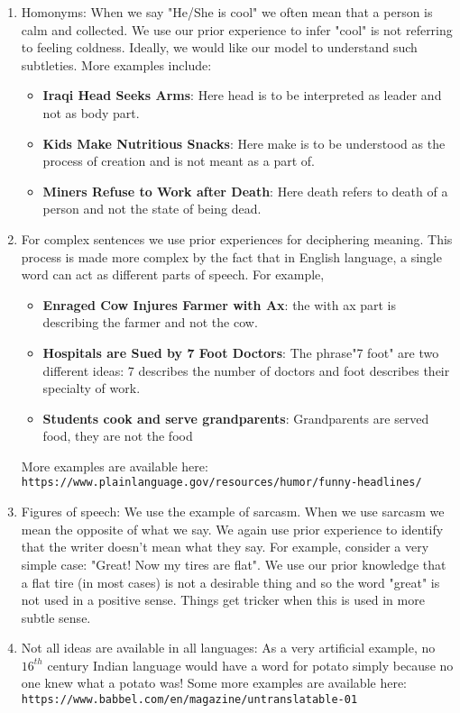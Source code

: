 \begin{enumerate}
    \item Homonyms: When we say "He/She is cool" we often mean that a person is calm and collected. We use our prior experience to infer "cool" is not referring to feeling coldness. Ideally, we would like our model to understand such subtleties. More examples include:
    \begin{itemize}
        \item \textbf{Iraqi Head Seeks Arms}: Here head is to be interpreted as leader and not as body part. 
        \item \textbf{Kids Make Nutritious Snacks}: Here make is to be understood as the process of creation and is not meant as a part of. 
        \item \textbf{Miners Refuse to Work after Death}: Here death refers to death of a person and not the state of being dead.
    \end{itemize}
    \item For complex sentences we use prior experiences for deciphering meaning. This process is made more complex by the fact that in English language, a single word can act as different parts of speech. For example, 
    \begin{itemize}
        \item \textbf{Enraged Cow Injures Farmer with Ax}: the with ax part is describing the farmer and not the cow.
        \item \textbf{Hospitals are Sued by 7 Foot Doctors}: The phrase"7 foot" are two different ideas: 7 describes the number of doctors and foot describes their specialty of work. 
        \item \textbf{Students cook and serve grandparents}: Grandparents are served food, they are not the food
    \end{itemize}
    More examples are available here:\\
    \verb|https://www.plainlanguage.gov/resources/humor/funny-headlines/|
    \item Figures of speech: We use the example of sarcasm. When we use sarcasm we mean the opposite of what we say. We again use prior experience to identify that the writer doesn't mean what they say. For example, consider a very simple case: "Great! Now my tires are flat". We use our prior knowledge that a flat tire (in most cases) is not a desirable thing and so the word "great" is not used in a positive sense. Things get tricker when this is used in more subtle sense.
    \item Not all ideas are available in all languages: As a very artificial example, no $16^{th}$ century Indian language would have a word for potato simply because no one knew what a potato was! Some more examples are available here:\\ \verb|https://www.babbel.com/en/magazine/untranslatable-01|

\end{enumerate}
